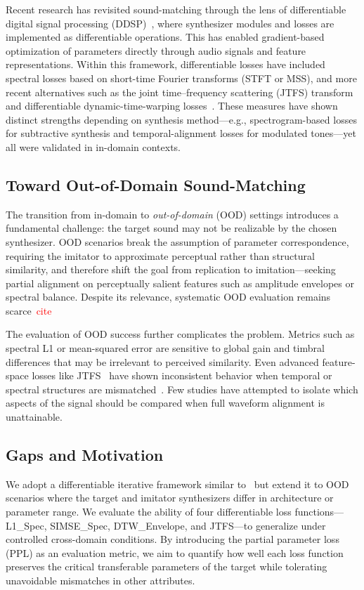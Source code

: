 \documentclass[runningheads]{llncs}
\newcommand{\todo}[1]{\textcolor{red}{#1}}
\begin{document}
Recent research has revisited sound-matching through the lens of differentiable digital signal processing (DDSP)~\cite{engel2020ddsp}, where synthesizer modules and losses are implemented as differentiable operations.  
This has enabled gradient-based optimization of parameters directly through audio signals and feature representations.  
Within this framework, differentiable losses have included spectral losses based on short-time Fourier transforms (STFT or MSS), and more recent alternatives such as the joint time–frequency scattering (JTFS) transform~\cite{vahidi2023mesostructures} and differentiable dynamic-time-warping losses~\cite{salimi2025evaluating}.  
These measures have shown distinct strengths depending on synthesis method—e.g., spectrogram-based losses for subtractive synthesis and temporal-alignment losses for modulated tones—yet all were validated in in-domain contexts.

\subsection{Toward Out-of-Domain Sound-Matching}
The transition from in-domain to \emph{out-of-domain} (OOD) settings introduces a fundamental challenge: the target sound may not be realizable by the chosen synthesizer. OOD scenarios break the assumption of parameter correspondence, requiring the imitator to approximate perceptual rather than structural similarity, and therefore shift the goal from replication to imitation—seeking partial alignment on perceptually salient features such as amplitude envelopes or spectral balance.  
Despite its relevance, systematic OOD evaluation remains scarce~\todo{cite}

The evaluation of OOD success further complicates the problem.  
Metrics such as spectral L1 or mean-squared error are sensitive to global gain and timbral differences that may be irrelevant to perceived similarity.  
Even advanced feature-space losses like JTFS~\cite{vahidi2023mesostructures} have shown inconsistent behavior when temporal or spectral structures are mismatched~\cite{salimi2025soundmatching}.  
Few studies have attempted to isolate which aspects of the signal should be compared when full waveform alignment is unattainable.

\subsection{Gaps and Motivation}
We adopt a differentiable iterative framework similar to~\cite{salimi2025evaluating} but extend it to OOD scenarios where the target and imitator synthesizers differ in architecture or parameter range.  
We evaluate the ability of four differentiable loss functions—L1\_Spec, SIMSE\_Spec, DTW\_Envelope, and JTFS—to generalize under controlled cross-domain conditions.  
By introducing the partial parameter loss (PPL) as an evaluation metric, we aim to quantify how well each loss function preserves the critical transferable parameters of the target while tolerating unavoidable mismatches in other attributes.
\end{document}
